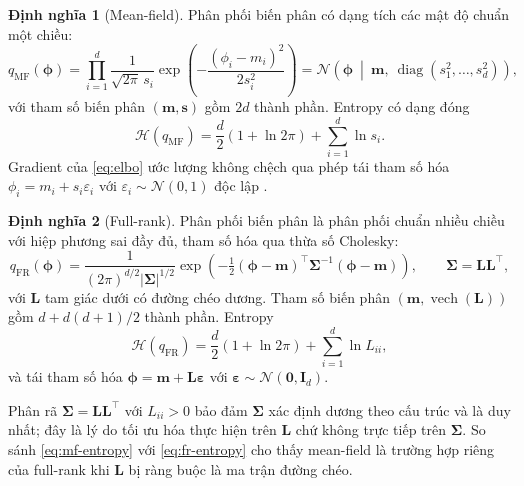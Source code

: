 \documentclass[12pt,a4paper]{article}
\numberwithin{equation}{section}
\theoremstyle{definition}
\newtheorem{definition}{Định nghĩa}[section]
\newcommand{\diag}{\operatorname{diag}}
\newcommand{\vecphi}{\symbf{\phi}}
\newcommand{\vech}{\operatorname{vech}}
\begin{document}
\begin{definition}[Mean-field]\label{def:mf}
Phân phối biến phân có dạng tích các mật độ chuẩn một chiều:
\begin{equation}
  q_{\mathrm{MF}}(\vecphi)
  =\prod_{i=1}^{d}\frac{1}{\sqrt{2\pi}\,s_i}
  \exp\!\left(-\frac{\left(\phi_i-m_i\right)^{2}}{2s_i^{2}}\right)
  =\mathcal{N}\!\left(\vecphi\ \middle|\ \symbf m,\ \diag(s_1^{2},\dots,s_d^{2})\right),
  \label{eq:mean-field}
\end{equation}
với tham số biến phân $(\symbf m,\symbf s)$ gồm $2d$ thành phần. Entropy có dạng đóng
\begin{equation}
  \mathcal{H}(q_{\mathrm{MF}})=\frac{d}{2}\left(1+\ln 2\pi\right)+\sum_{i=1}^{d}\ln s_i.
  \label{eq:mf-entropy}
\end{equation}
Gradient của \eqref{eq:elbo} ước lượng không chệch qua phép tái tham số hóa
$\phi_i=m_i+s_i\varepsilon_i$ với $\varepsilon_i\sim\mathcal{N}(0,1)$ độc lập
\cite{kingma2014}.
\end{definition}

\begin{definition}[Full-rank]\label{def:fr}
Phân phối biến phân là phân phối chuẩn nhiều chiều với hiệp phương sai đầy đủ, tham số
hóa qua thừa số Cholesky:
\begin{equation}
  q_{\mathrm{FR}}(\vecphi)
  =\frac{1}{(2\pi)^{d/2}\left|\symbf\Sigma\right|^{1/2}}
  \exp\!\left(-\tfrac{1}{2}\left(\vecphi-\symbf m\right)^{\top}
  \symbf\Sigma^{-1}\left(\vecphi-\symbf m\right)\right),
  \qquad \symbf\Sigma=\symbf L\symbf L^{\top},
  \label{eq:full-rank}
\end{equation}
với $\symbf L$ tam giác dưới có đường chéo dương. Tham số biến phân
$(\symbf m,\vech(\symbf L))$ gồm $d+d(d+1)/2$ thành phần. Entropy
\begin{equation}
  \mathcal{H}(q_{\mathrm{FR}})=\frac{d}{2}\left(1+\ln 2\pi\right)+\sum_{i=1}^{d}\ln L_{ii},
  \label{eq:fr-entropy}
\end{equation}
và tái tham số hóa $\vecphi=\symbf m+\symbf L\symbf\varepsilon$ với
$\symbf\varepsilon\sim\mathcal{N}(\symbf 0,\symbf I_d)$.
\end{definition}

Phân rã $\symbf\Sigma=\symbf L\symbf L^{\top}$ với $L_{ii}>0$ bảo đảm $\symbf\Sigma$ xác
định dương theo cấu trúc và là duy nhất; đây là lý do tối ưu hóa thực hiện trên
$\symbf L$ chứ không trực tiếp trên $\symbf\Sigma$. So sánh \eqref{eq:mf-entropy} với
\eqref{eq:fr-entropy} cho thấy mean-field là trường hợp riêng của full-rank khi
$\symbf L$ bị ràng buộc là ma trận đường chéo.
\end{document}
